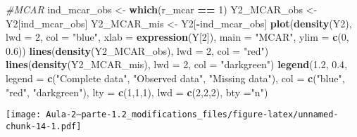 \documentclass[
]{article}
\newenvironment{Shaded}{\begin{snugshade}}{\end{snugshade}}
\newcommand{\AttributeTok}[1]{\textcolor[rgb]{0.13,0.29,0.53}{#1}}
\newcommand{\CommentTok}[1]{\textcolor[rgb]{0.56,0.35,0.01}{\textit{#1}}}
\newcommand{\DecValTok}[1]{\textcolor[rgb]{0.00,0.00,0.81}{#1}}
\newcommand{\FloatTok}[1]{\textcolor[rgb]{0.00,0.00,0.81}{#1}}
\newcommand{\FunctionTok}[1]{\textcolor[rgb]{0.13,0.29,0.53}{\textbf{#1}}}
\newcommand{\NormalTok}[1]{#1}
\newcommand{\OtherTok}[1]{\textcolor[rgb]{0.56,0.35,0.01}{#1}}
\newcommand{\SpecialCharTok}[1]{\textcolor[rgb]{0.81,0.36,0.00}{\textbf{#1}}}
\newcommand{\StringTok}[1]{\textcolor[rgb]{0.31,0.60,0.02}{#1}}
\begin{document}
\begin{Shaded}
\begin{Highlighting}[]
\CommentTok{\#MCAR}
\NormalTok{ind\_mcar\_obs }\OtherTok{\textless{}{-}} \FunctionTok{which}\NormalTok{(r\_mcar }\SpecialCharTok{==} \DecValTok{1}\NormalTok{)}
\NormalTok{Y2\_MCAR\_obs }\OtherTok{\textless{}{-}}\NormalTok{ Y2[ind\_mcar\_obs]}
\NormalTok{Y2\_MCAR\_mis }\OtherTok{\textless{}{-}}\NormalTok{ Y2[}\SpecialCharTok{{-}}\NormalTok{ind\_mcar\_obs]}
\FunctionTok{plot}\NormalTok{(}\FunctionTok{density}\NormalTok{(Y2), }\AttributeTok{lwd =} \DecValTok{2}\NormalTok{, }\AttributeTok{col =} \StringTok{"blue"}\NormalTok{, }\AttributeTok{xlab =} \FunctionTok{expression}\NormalTok{(Y[}\DecValTok{2}\NormalTok{]), }\AttributeTok{main =} \StringTok{"MCAR"}\NormalTok{, }\AttributeTok{ylim =} \FunctionTok{c}\NormalTok{(}\DecValTok{0}\NormalTok{, }\FloatTok{0.6}\NormalTok{))}
\FunctionTok{lines}\NormalTok{(}\FunctionTok{density}\NormalTok{(Y2\_MCAR\_obs), }\AttributeTok{lwd =} \DecValTok{2}\NormalTok{, }\AttributeTok{col =} \StringTok{"red"}\NormalTok{)}
\FunctionTok{lines}\NormalTok{(}\FunctionTok{density}\NormalTok{(Y2\_MCAR\_mis), }\AttributeTok{lwd =} \DecValTok{2}\NormalTok{, }\AttributeTok{col =} \StringTok{"darkgreen"}\NormalTok{)}
\FunctionTok{legend}\NormalTok{(}\FloatTok{1.2}\NormalTok{, }\FloatTok{0.4}\NormalTok{, }\AttributeTok{legend =} \FunctionTok{c}\NormalTok{(}\StringTok{"Complete data"}\NormalTok{, }\StringTok{"Observed data"}\NormalTok{, }\StringTok{"Missing data"}\NormalTok{), }
       \AttributeTok{col =} \FunctionTok{c}\NormalTok{(}\StringTok{"blue"}\NormalTok{, }\StringTok{"red"}\NormalTok{, }\StringTok{"darkgreen"}\NormalTok{), }\AttributeTok{lty =} \FunctionTok{c}\NormalTok{(}\DecValTok{1}\NormalTok{,}\DecValTok{1}\NormalTok{,}\DecValTok{1}\NormalTok{), }\AttributeTok{lwd =} \FunctionTok{c}\NormalTok{(}\DecValTok{2}\NormalTok{,}\DecValTok{2}\NormalTok{,}\DecValTok{2}\NormalTok{), }\AttributeTok{bty =}\StringTok{"n"}\NormalTok{)}
\end{Highlighting}
\end{Shaded}

\texttt{[image: Aula-2---parte-1.2\_modifications\_files/figure-latex/unnamed-chunk-14-1.pdf]}
\end{document}
